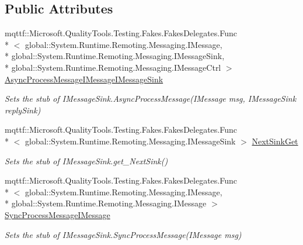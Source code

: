 \subsection*{Public Attributes}
\begin{DoxyCompactItemize}
\item 
mqttf\-::\-Microsoft.\-Quality\-Tools.\-Testing.\-Fakes.\-Fakes\-Delegates.\-Func\\*
$<$ global\-::\-System.\-Runtime.\-Remoting.\-Messaging.\-I\-Message, \\*
global\-::\-System.\-Runtime.\-Remoting.\-Messaging.\-I\-Message\-Sink, \\*
global\-::\-System.\-Runtime.\-Remoting.\-Messaging.\-I\-Message\-Ctrl $>$ \hyperlink{class_system_1_1_runtime_1_1_remoting_1_1_messaging_1_1_fakes_1_1_stub_i_message_sink_a9e131d128768630fcbf1233d90e49f64}{Async\-Process\-Message\-I\-Message\-I\-Message\-Sink}
\begin{DoxyCompactList}\small\item\em Sets the stub of I\-Message\-Sink.\-Async\-Process\-Message(\-I\-Message msg, I\-Message\-Sink reply\-Sink)\end{DoxyCompactList}\item 
mqttf\-::\-Microsoft.\-Quality\-Tools.\-Testing.\-Fakes.\-Fakes\-Delegates.\-Func\\*
$<$ global\-::\-System.\-Runtime.\-Remoting.\-Messaging.\-I\-Message\-Sink $>$ \hyperlink{class_system_1_1_runtime_1_1_remoting_1_1_messaging_1_1_fakes_1_1_stub_i_message_sink_a53762246c31a28ffc99eb089a4f33421}{Next\-Sink\-Get}
\begin{DoxyCompactList}\small\item\em Sets the stub of I\-Message\-Sink.\-get\-\_\-\-Next\-Sink()\end{DoxyCompactList}\item 
mqttf\-::\-Microsoft.\-Quality\-Tools.\-Testing.\-Fakes.\-Fakes\-Delegates.\-Func\\*
$<$ global\-::\-System.\-Runtime.\-Remoting.\-Messaging.\-I\-Message, \\*
global\-::\-System.\-Runtime.\-Remoting.\-Messaging.\-I\-Message $>$ \hyperlink{class_system_1_1_runtime_1_1_remoting_1_1_messaging_1_1_fakes_1_1_stub_i_message_sink_a414b6a0c64d0dabefe1cfc35471d8031}{Sync\-Process\-Message\-I\-Message}
\begin{DoxyCompactList}\small\item\em Sets the stub of I\-Message\-Sink.\-Sync\-Process\-Message(\-I\-Message msg)\end{DoxyCompactList}\end{DoxyCompactItemize}


